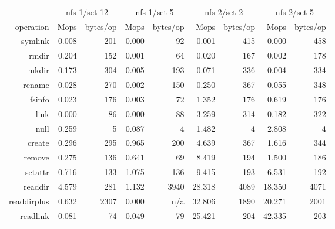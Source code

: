 \begin{table*}
\begin{tabular}{|r||r|r||r|r||r|r||r|r|}
\hline
  & \multicolumn{2}{c||}{nfs-1/set-12} & \multicolumn{2}{c||}{nfs-1/set-5} & \multicolumn{2}{c||}{nfs-2/set-2} & \multicolumn{2}{c|}{nfs-2/set-5} \\
   operation &   Mops & bytes/op &   Mops & bytes/op &   Mops & bytes/op &   Mops & bytes/op \\
\hline
     symlink &     0.008 &   201 &     0.000 &    92 &     0.001 &   415 &     0.000 &   458 \\
       rmdir &     0.204 &   152 &     0.001 &    64 &     0.020 &   167 &     0.002 &   178 \\
       mkdir &     0.173 &   304 &     0.005 &   193 &     0.071 &   336 &     0.004 &   334 \\
      rename &     0.028 &   270 &     0.002 &   150 &     0.250 &   367 &     0.055 &   348 \\
\hline
      fsinfo &     0.023 &   176 &     0.003 &    72 &     1.352 &   176 &     0.619 &   176 \\
        link &     0.000 &    86 &     0.000 &    88 &     3.259 &   314 &     0.182 &   322 \\
        null &     0.259 &     5 &     0.087 &     4 &     1.482 &     4 &     2.808 &     4 \\
      create &     0.296 &   295 &     0.965 &   200 &     4.639 &   367 &     1.616 &   344 \\
\hline
      remove &     0.275 &   136 &     0.641 &    69 &     8.419 &   194 &     1.500 &   186 \\
     setattr &     0.716 &   133 &     1.075 &   136 &     9.415 &   193 &     6.531 &   192 \\
     readdir &     4.579 &   281 &     1.132 &  3940 &    28.318 &  4089 &    18.350 &  4071 \\
 readdirplus &     0.632 &  2307 &     0.000 &  n/a  &    32.806 &  1890 &    20.271 &  2001 \\
\hline
    readlink &     0.081 &    74 &     0.049 &    79 &    25.421 &   204 &    42.335 &   203 \\

\end{tabular}
\end{table*}
